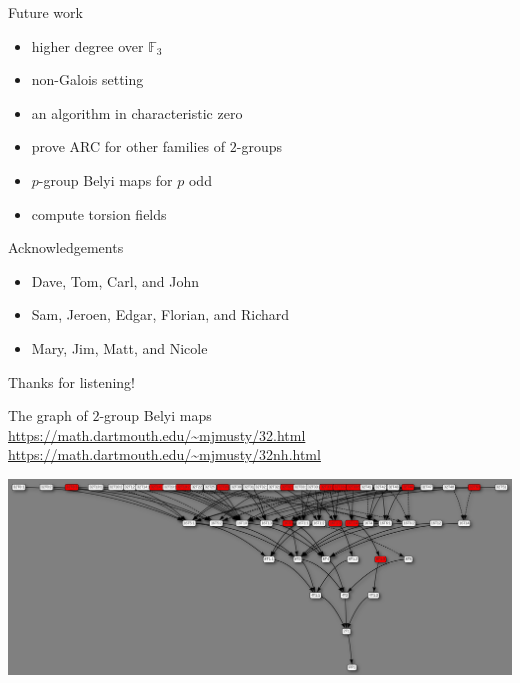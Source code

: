 \documentclass[xcolor=dvipsnames]{beamer}
\theoremstyle{plain}
\newcommand{\FF}{\mathbb{F}}
\begin{document}
  \begin{frame}{Future work}
    \begin{itemize}
      \item
        higher degree over $\FF_3$
      \item
        non-Galois setting
      \item
        an algorithm in characteristic zero
      \item
        prove ARC for other families of $2$-groups
      \item
        $p$-group Belyi maps for $p$ odd
      \item
        compute torsion fields
    \end{itemize}
  \end{frame}
  \begin{frame}{Acknowledgements}
    \begin{itemize}
      \item
        Dave, Tom, Carl, and John
      \item
        Sam, Jeroen, Edgar, Florian, and Richard
      \item
        Mary, Jim, Matt, and Nicole
    \end{itemize}
    \pause
    \begin{center}
      {\Huge Thanks for listening!}
    \end{center}
  \end{frame}
  \appendix
  \begin{frame}{The graph of $2$-group Belyi maps}
    \url{https://math.dartmouth.edu/~mjmusty/32.html}
    \newline
    \url{https://math.dartmouth.edu/~mjmusty/32nh.html}
    \begin{center}
      \includegraphics[scale=0.17]{32.png}
    \end{center}
  \end{frame}
\end{document}
